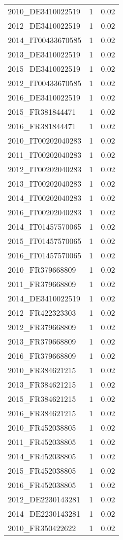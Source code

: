 \begin{table*}[htbp]
\begin{tabular}{lrr}
2010_DE3410022519 & 1 & 0.02 \\
2012_DE3410022519 & 1 & 0.02 \\
2014_IT00433670585 & 1 & 0.02 \\
2013_DE3410022519 & 1 & 0.02 \\
2015_DE3410022519 & 1 & 0.02 \\
2012_IT00433670585 & 1 & 0.02 \\
2016_DE3410022519 & 1 & 0.02 \\
2015_FR381844471 & 1 & 0.02 \\
2016_FR381844471 & 1 & 0.02 \\
2010_IT00202040283 & 1 & 0.02 \\
2011_IT00202040283 & 1 & 0.02 \\
2012_IT00202040283 & 1 & 0.02 \\
2013_IT00202040283 & 1 & 0.02 \\
2014_IT00202040283 & 1 & 0.02 \\
2016_IT00202040283 & 1 & 0.02 \\
2014_IT01457570065 & 1 & 0.02 \\
2015_IT01457570065 & 1 & 0.02 \\
2016_IT01457570065 & 1 & 0.02 \\
2010_FR379668809 & 1 & 0.02 \\
2011_FR379668809 & 1 & 0.02 \\
2014_DE3410022519 & 1 & 0.02 \\
2012_FR422323303 & 1 & 0.02 \\
2012_FR379668809 & 1 & 0.02 \\
2013_FR379668809 & 1 & 0.02 \\
2016_FR379668809 & 1 & 0.02 \\
2010_FR384621215 & 1 & 0.02 \\
2013_FR384621215 & 1 & 0.02 \\
2015_FR384621215 & 1 & 0.02 \\
2016_FR384621215 & 1 & 0.02 \\
2010_FR452038805 & 1 & 0.02 \\
2011_FR452038805 & 1 & 0.02 \\
2014_FR452038805 & 1 & 0.02 \\
2015_FR452038805 & 1 & 0.02 \\
2016_FR452038805 & 1 & 0.02 \\
2012_DE2230143281 & 1 & 0.02 \\
2014_DE2230143281 & 1 & 0.02 \\
2010_FR350422622 & 1 & 0.02 \\

\end{tabular}
\end{table*}
